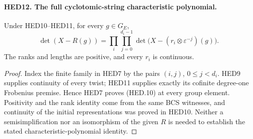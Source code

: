 \paragraph{HED12. The full cyclotomic-string characteristic polynomial.}
\label{claim:HED12}
Under HED10--HED11, for every \(g\in G_E\),
\[
 \det(X-R(g))=
     \prod_i\prod_{j=0}^{d_i-1}
             \det\bigl(X-(r_i\otimes\varepsilon^{-j})(g)\bigr).
 \tag{HED.10}
\]
The ranks and lengths are positive, and every \(r_i\) is continuous.
\begin{proof}
Index the finite family in HED7 by the pairs \((i,j)\),
\(0\leq j<d_i\).  HED9 supplies continuity of every twist;
HED11 supplies exactly its cofinite degree-one Frobenius premise.
Hence HED7 proves (HED.10) at every group element.  Positivity and
the rank identity come from the same BCS witnesses, and continuity
of the initial representations was proved in HED10.  Neither a
semisimplification nor an isomorphism of the given \(R\) is needed
to establish the stated characteristic-polynomial identity.
\end{proof}

